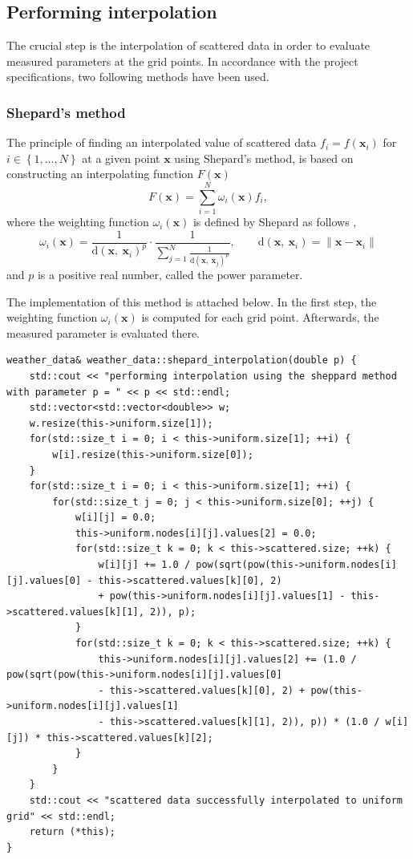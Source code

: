 \documentclass[a4paper, 10pt]{article}
\renewcommand{\vec}[1]{\mathbf{#1}}
\begin{document}
\subsection{Performing interpolation}
The crucial step is the interpolation of scattered data in order to evaluate measured parameters at the grid points. In accordance with the project specifications, two following methods have been used.
\subsubsection*{Shepard's method}
The principle of finding an interpolated value of scattered data $ f_{i} = f\left( \vec{x}_{i} \right) $ for $ i \in \left\lbrace 1, \ldots, N \right\rbrace $ at a given point $ \vec{x} $ using Shepard's method, is based on constructing an interpolating function $ F\left( \vec{x} \right) $
\begin{equation}
F \left( \vec{x} \right) = \sum_{i = 1}^{N} \omega_{i} \left( \vec{x} \right) f_{i},
\end{equation}
where the weighting function $ \omega_{i} \left( \vec{x} \right) $ is defined by Shepard as follows \cite{shepard},
\begin{equation}
\omega_{i} \left( \vec{x} \right) = \frac{1}{\mathrm{d} \left( \vec{x}, \: \vec{x}_{i}\right) ^{p}} \cdot \frac{1}{\sum \limits_{j = 1}^{N} \frac{1}{\mathrm{d} \left( \vec{x}, \: \vec{x}_{j}\right) ^{p}}}, \qquad \mathrm{d}\left( \vec{x}, \: \vec{x}_{i} \right) = \lVert \vec{x} - \vec{x}_{i} \rVert
\end{equation}
and $ p $ is a positive real number, called the power parameter.

The implementation of this method is attached below. In the first step, the weighting function $ \omega_{i} \left( \vec{x} \right) $ is computed for each grid point. Afterwards, the measured parameter is evaluated there.
\begin{lstlisting}[caption = implementation of Shepard's method]
weather_data& weather_data::shepard_interpolation(double p) {
	std::cout << "performing interpolation using the sheppard method with parameter p = " << p << std::endl;
	std::vector<std::vector<double>> w;
	w.resize(this->uniform.size[1]);
	for(std::size_t i = 0; i < this->uniform.size[1]; ++i) {
		w[i].resize(this->uniform.size[0]);
	}
	for(std::size_t i = 0; i < this->uniform.size[1]; ++i) {
		for(std::size_t j = 0; j < this->uniform.size[0]; ++j) {
			w[i][j] = 0.0;
			this->uniform.nodes[i][j].values[2] = 0.0;
			for(std::size_t k = 0; k < this->scattered.size; ++k) {
				w[i][j] += 1.0 / pow(sqrt(pow(this->uniform.nodes[i][j].values[0] - this->scattered.values[k][0], 2)
				+ pow(this->uniform.nodes[i][j].values[1] - this->scattered.values[k][1], 2)), p);
			}
			for(std::size_t k = 0; k < this->scattered.size; ++k) {
				this->uniform.nodes[i][j].values[2] += (1.0 / pow(sqrt(pow(this->uniform.nodes[i][j].values[0]
				- this->scattered.values[k][0], 2) + pow(this->uniform.nodes[i][j].values[1]
				- this->scattered.values[k][1], 2)), p)) * (1.0 / w[i][j]) * this->scattered.values[k][2];
			}
		}
	}
	std::cout << "scattered data successfully interpolated to uniform grid" << std::endl;
	return (*this);
}
\end{lstlisting}
\end{document}

